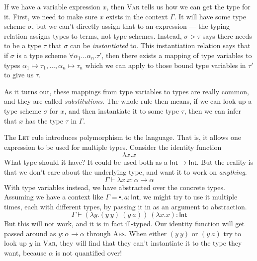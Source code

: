 If we have a variable expression $x$, then \textsc{Var} tells us how
we can get the type for it. First, we need to make sure $x$ exists in
the context $\Gamma$. It will have some type scheme $\sigma$, but we can't
directly assign that to an expression --- the typing relation assigns
types to terms, not type schemes. Instead, $\sigma > \tau$ says there needs to
be a type $\tau$ that $\sigma$ can be \emph{instantiated} to. This
instantiation relation says that if $\sigma$ is a type scheme
$\forall \alpha_1\ldots\alpha_n . \tau'$, then there exists a mapping of type variables to
types ${\alpha_1\mapsto\tau_1,\ldots,\alpha_n\mapsto\tau_n}$ which we can apply to those bound type
variables in $\tau'$ to give us $\tau$.

As it turns out, these mappings from type
variables to types are really common, and they are called
\emph{substitutions}.  The whole rule then means, if we can look up a
type scheme $\sigma$ for $x$, and then instantiate it to some type
$\tau$, then we can infer that $x$ has the type $\tau$ in $\Gamma$.

The \textsc{Let} rule introduces polymorphism to the language. That
is, it allows one expression to be used for multiple types. Consider
the identity function
\[ \lambda x . x \]
What type should it have? It could be used both as a
$\mathsf{Int} \rightarrow \mathsf{Int}$. But the reality is that we don't care
about the underlying type, and want it to work on \emph{anything}.
\[ \Gamma \vdash \lambda x . x : \alpha \rightarrow \alpha \]
With type variables instead, we have abstracted over the concrete
types.
Assuming we have a context
like $\Gamma = \centerdot , a : \mathsf{Int}$, we might try to use it multiple
times, each with different types, by passing it in as an argument to
abstraction.
\[ \Gamma \vdash (\lambda y . (y \ y) \ (y \ a)) \ (\lambda x . x) : \mathsf{Int} \]
But this will not work, and it is in fact ill-typed. Our identity
function will get passed around as ${y : \alpha \rightarrow \alpha}$ through \textsc{Abs}. When
either $(y \ y)$ or $(y \ a)$ try to look up $y$ in \textsc{Var}, they
will find that they can't instantiate it to the type they want,
because $\alpha$ is not quantified over!

